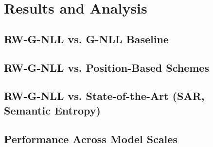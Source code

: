\documentclass[a4paper,oneside,10pt,ngerman,english]{scrbook}
\begin{document}
\chapter{Results and Analysis}
\label{ch:results}
\section{RW-G-NLL vs. G-NLL Baseline}
\section{RW-G-NLL vs. Position-Based Schemes}
\section{RW-G-NLL vs. State-of-the-Art (SAR, Semantic Entropy)}
\section{Performance Across Model Scales}
\end{document}
